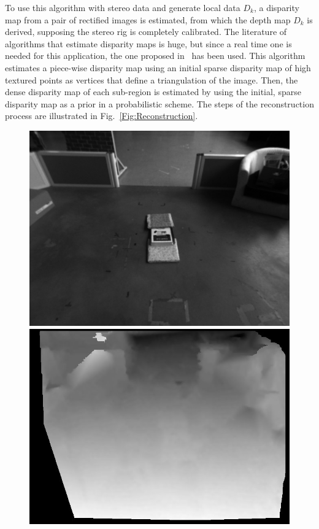 To use this algorithm with stereo data and generate local data $D_k$, a disparity map from a pair of rectified images is estimated, from which the depth map $D_k$ is derived, supposing the stereo rig is completely calibrated. The literature of algorithms that estimate disparity maps is huge, but since a real time one is needed for this application, the one proposed in~\cite{Geiger2010} has been used. This algorithm estimates a piece-wise disparity map using an initial sparse disparity map of high textured points as vertices that define a triangulation of the image. Then, the dense disparity map of each sub-region is estimated by using the initial, sparse disparity map as a prior in a probabilistic scheme. The steps of the reconstruction process are illustrated in Fig.~\ref{Fig:Reconstruction}.

\begin{figure}[h]
\centering
\includegraphics[scale=0.17]{figures/right0001}
\hspace{0.2cm}
\includegraphics[scale=0.17]{figures/left0001_disp}

\end{figure}
